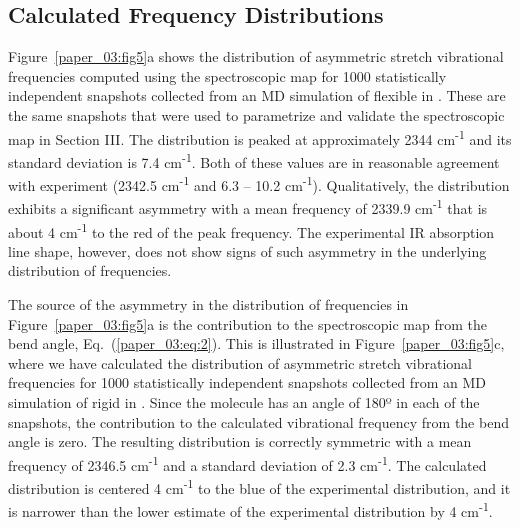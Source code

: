 \documentclass[]{article}
\begin{document}
\subsection{Calculated Frequency Distributions}
\label{paper_03:ssec:V-B}

Figure~\ref{paper_03:fig5}a shows the distribution of  asymmetric stretch vibrational frequencies computed using the spectroscopic map for 1000 statistically independent snapshots collected from an MD simulation of flexible  in \ce{[C4C1im][PF6]}.  These are the same snapshots that were used to parametrize and validate the spectroscopic map in Section III. The distribution is peaked at approximately 2344 cm\textsuperscript{-1} and its standard deviation is 7.4 cm\textsuperscript{-1}. Both of these values are in reasonable agreement with experiment (2342.5 cm\textsuperscript{-1} and 6.3 -- 10.2 cm\textsuperscript{-1}). Qualitatively, the distribution exhibits a significant asymmetry with a mean frequency of 2339.9 cm\textsuperscript{-1} that is about 4 cm\textsuperscript{-1} to the red of the peak frequency. The experimental IR absorption line shape, however, does not show signs of such asymmetry in the underlying distribution of frequencies.

The source of the asymmetry in the distribution of frequencies in Figure~\ref{paper_03:fig5}a is the contribution to the spectroscopic map from the  bend angle, Eq.~(\ref{paper_03:eq:2}). This is illustrated in Figure~\ref{paper_03:fig5}c, where we have calculated the distribution of  asymmetric stretch vibrational frequencies for 1000 statistically independent snapshots collected from an MD simulation of rigid  in \ce{[C4C1im][PF6]}. Since the  molecule has an angle of 180º in each of the snapshots, the contribution to the calculated vibrational frequency from the  bend angle is zero. The resulting distribution is correctly symmetric with a mean frequency of 2346.5 cm\textsuperscript{-1} and a standard deviation of 2.3 cm\textsuperscript{-1}. The calculated distribution is centered 4 cm\textsuperscript{-1} to the blue of the experimental distribution, and it is narrower than the lower estimate of the experimental distribution by 4 cm\textsuperscript{-1}.
\end{document}
